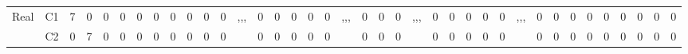 \documentclass[12pt]{article}
\begin{document}
\begin{table}[!ht]
{\begin{tabular}{cccccccccccccccccccccccccccccccccccccc}
\multicolumn{1}{c|}{\multirow{22}{*}{Real}} & \multicolumn{1}{c|}{C1}  & \multicolumn{1}{c|}{7}  & \multicolumn{1}{c|}{0}  & \multicolumn{1}{c|}{0}  & \multicolumn{1}{c|}{0}  & \multicolumn{1}{c|}{0}  & \multicolumn{1}{c|}{0}  & \multicolumn{1}{c|}{0}  & \multicolumn{1}{c|}{0}  & \multicolumn{1}{c|}{0}  & \multicolumn{1}{c|}{0}  & \multicolumn{1}{c|}{\multirow{5}{*}{,,,}} & \multicolumn{1}{c|}{0}  & \multicolumn{1}{c|}{0}  & \multicolumn{1}{c|}{0}  & \multicolumn{1}{c|}{0}  & \multicolumn{1}{c|}{0}  & \multicolumn{1}{c|}{\multirow{5}{*}{,,,}} & \multicolumn{1}{c|}{0}  & \multicolumn{1}{c|}{0}  & \multicolumn{1}{c|}{0}  & \multicolumn{1}{c|}{\multirow{5}{*}{,,,}} & \multicolumn{1}{c|}{0}  & \multicolumn{1}{c|}{0}  & \multicolumn{1}{c|}{0}  & \multicolumn{1}{c|}{0}  & \multicolumn{1}{c|}{0}  & \multicolumn{1}{c|}{\multirow{5}{*}{,,,}} & \multicolumn{1}{c|}{0}  & \multicolumn{1}{c|}{0}  & \multicolumn{1}{c|}{0}  & \multicolumn{1}{c|}{0}  & \multicolumn{1}{c|}{0}  & \multicolumn{1}{c|}{0}  & \multicolumn{1}{c|}{0}  & \multicolumn{1}{c|}{0}  & \multicolumn{1}{c|}{0}  \\ \cline{2-12} \cline{14-18} \cline{20-22} \cline{24-28} \cline{30-38} 
\multicolumn{1}{c|}{}                       & \multicolumn{1}{c|}{C2}  & \multicolumn{1}{c|}{0}  & \multicolumn{1}{c|}{7}  & \multicolumn{1}{c|}{0}  & \multicolumn{1}{c|}{0}  & \multicolumn{1}{c|}{0}  & \multicolumn{1}{c|}{0}  & \multicolumn{1}{c|}{0}  & \multicolumn{1}{c|}{0}  & \multicolumn{1}{c|}{0}  & \multicolumn{1}{c|}{0}  & \multicolumn{1}{c|}{}                     & \multicolumn{1}{c|}{0}  & \multicolumn{1}{c|}{0}  & \multicolumn{1}{c|}{0}  & \multicolumn{1}{c|}{0}  & \multicolumn{1}{c|}{0}  & \multicolumn{1}{c|}{}                     & \multicolumn{1}{c|}{0}  & \multicolumn{1}{c|}{0}  & \multicolumn{1}{c|}{0}  & \multicolumn{1}{c|}{}                     & \multicolumn{1}{c|}{0}  & \multicolumn{1}{c|}{0}  & \multicolumn{1}{c|}{0}  & \multicolumn{1}{c|}{0}  & \multicolumn{1}{c|}{0}  & \multicolumn{1}{c|}{}                     & \multicolumn{1}{c|}{0}  & \multicolumn{1}{c|}{0}  & \multicolumn{1}{c|}{0}  & \multicolumn{1}{c|}{0}  & \multicolumn{1}{c|}{0}  & \multicolumn{1}{c|}{0}  & \multicolumn{1}{c|}{0}  & \multicolumn{1}{c|}{0}  & \multicolumn{1}{c|}{0}  \\ \cline{2-12} \cline{14-18} \cline{20-22} \cline{24-28} \cline{30-38} 

\end{tabular}}
\end{table}
\end{document}
